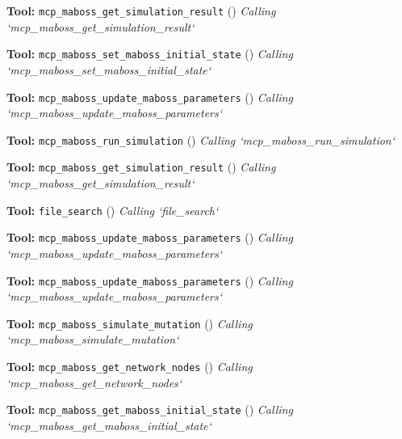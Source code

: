 \documentclass[11pt,a4paper]{article}
\begin{document}
\begin{toolokbox}
\textbf{Tool:} \texttt{mcp\_maboss\_get\_simulation\_result} (\checkmark)
\textit{Calling `mcp\_maboss\_get\_simulation\_result`}
\end{toolokbox}
\begin{toolokbox}
\textbf{Tool:} \texttt{mcp\_maboss\_set\_maboss\_initial\_state} (\checkmark)
\textit{Calling `mcp\_maboss\_set\_maboss\_initial\_state`}
\end{toolokbox}
\begin{toolokbox}
\textbf{Tool:} \texttt{mcp\_maboss\_update\_maboss\_parameters} (\checkmark)
\textit{Calling `mcp\_maboss\_update\_maboss\_parameters`}
\end{toolokbox}
\begin{toolokbox}
\textbf{Tool:} \texttt{mcp\_maboss\_run\_simulation} (\checkmark)
\textit{Calling `mcp\_maboss\_run\_simulation`}
\end{toolokbox}
\begin{toolokbox}
\textbf{Tool:} \texttt{mcp\_maboss\_get\_simulation\_result} (\checkmark)
\textit{Calling `mcp\_maboss\_get\_simulation\_result`}
\end{toolokbox}
\begin{toolokbox}
\textbf{Tool:} \texttt{file\_search} (\checkmark)
\textit{Calling `file\_search`}
\end{toolokbox}
\begin{toolokbox}
\textbf{Tool:} \texttt{mcp\_maboss\_update\_maboss\_parameters} (\checkmark)
\textit{Calling `mcp\_maboss\_update\_maboss\_parameters`}
\end{toolokbox}
\begin{toolokbox}
\textbf{Tool:} \texttt{mcp\_maboss\_update\_maboss\_parameters} (\checkmark)
\textit{Calling `mcp\_maboss\_update\_maboss\_parameters`}
\end{toolokbox}
\begin{toolokbox}
\textbf{Tool:} \texttt{mcp\_maboss\_simulate\_mutation} (\checkmark)
\textit{Calling `mcp\_maboss\_simulate\_mutation`}
\end{toolokbox}
\begin{toolokbox}
\textbf{Tool:} \texttt{mcp\_maboss\_get\_network\_nodes} (\checkmark)
\textit{Calling `mcp\_maboss\_get\_network\_nodes`}
\end{toolokbox}
\begin{toolokbox}
\textbf{Tool:} \texttt{mcp\_maboss\_get\_maboss\_initial\_state} (\checkmark)
\textit{Calling `mcp\_maboss\_get\_maboss\_initial\_state`}
\end{toolokbox}
\end{document}
